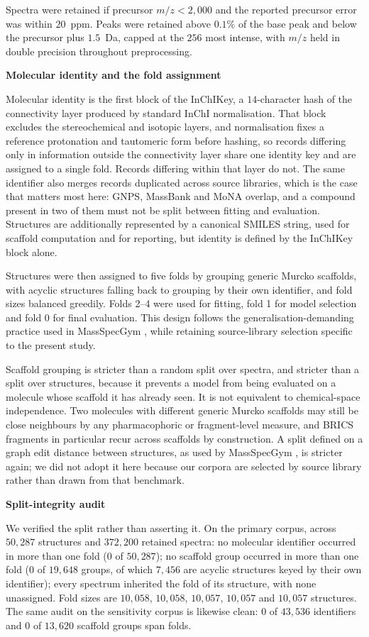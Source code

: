 \documentclass[11pt]{article}
\newcommand{\hd}[1]{\medskip\par\noindent\textbf{#1}\par\nobreak\vspace{2pt}\noindent\ignorespaces}
\newcommand{\mz}{\ensuremath{m/z}}
\begin{document}
Spectra were retained if precursor $\mz<2{,}000$ and the reported precursor error was within $20$~ppm. Peaks were retained above $0.1\%$ of the base peak and below the precursor plus $1.5$~Da, capped at the $256$ most intense, with $\mz$ held in double precision throughout preprocessing.

\hd{Molecular identity and the fold assignment}
Molecular identity is the first block of the InChIKey, a $14$-character hash of the connectivity layer produced by standard InChI normalisation. That block excludes the stereochemical and isotopic layers, and normalisation fixes a reference protonation and tautomeric form before hashing, so records differing only in information outside the connectivity layer share one identity key and are assigned to a single fold. Records differing within that layer do not. The same identifier also merges records duplicated across source libraries, which is the case that matters most here: GNPS, MassBank and MoNA overlap, and a compound present in two of them must not be split between fitting and evaluation. Structures are additionally represented by a canonical SMILES string, used for scaffold computation and for reporting, but identity is defined by the InChIKey block alone.

Structures were then assigned to five folds by grouping generic Murcko scaffolds, with acyclic structures falling back to grouping by their own identifier, and fold sizes balanced greedily. Folds 2--4 were used for fitting, fold 1 for model selection and fold 0 for final evaluation. This design follows the generalisation-demanding practice used in MassSpecGym \cite{bushuiev2024massspecgym}, while retaining source-library selection specific to the present study.

Scaffold grouping is stricter than a random split over spectra, and stricter than a split over structures, because it prevents a model from being evaluated on a molecule whose scaffold it has already seen. It is not equivalent to chemical-space independence. Two molecules with different generic Murcko scaffolds may still be close neighbours by any pharmacophoric or fragment-level measure, and BRICS fragments in particular recur across scaffolds by construction. A split defined on a graph edit distance between structures, as used by MassSpecGym \cite{bushuiev2024massspecgym}, is stricter again; we did not adopt it here because our corpora are selected by source library rather than drawn from that benchmark.

\hd{Split-integrity audit}
We verified the split rather than asserting it. On the primary corpus, across $50{,}287$ structures and $372{,}200$ retained spectra: no molecular identifier occurred in more than one fold ($0$ of $50{,}287$); no scaffold group occurred in more than one fold ($0$ of $19{,}648$ groups, of which $7{,}456$ are acyclic structures keyed by their own identifier); every spectrum inherited the fold of its structure, with none unassigned. Fold sizes are $10{,}058$, $10{,}058$, $10{,}057$, $10{,}057$ and $10{,}057$ structures. The same audit on the sensitivity corpus is likewise clean: $0$ of $43{,}536$ identifiers and $0$ of $13{,}620$ scaffold groups span folds.
\end{document}
